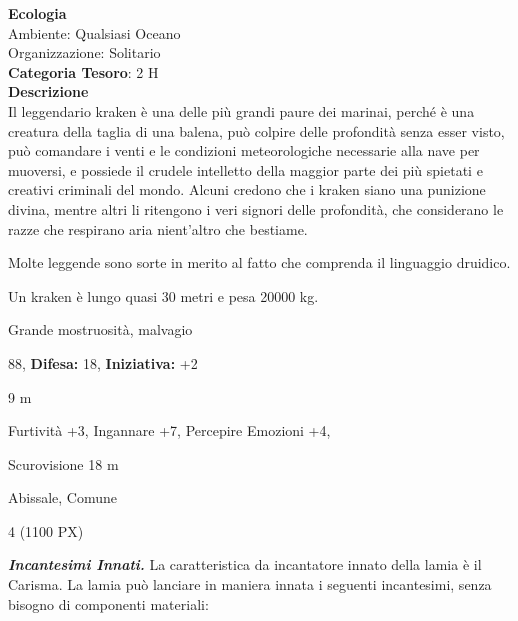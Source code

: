 \begin{multicols}{2}
{\textbf{Ecologia}\\
Ambiente: Qualsiasi Oceano\\
Organizzazione: Solitario\\
\textbf{Categoria Tesoro}: 2 H\\
\textbf{Descrizione}\\
Il leggendario kraken è una delle più grandi paure dei marinai, perché è una creatura della taglia di una balena, può colpire delle profondità senza esser visto, può comandare i venti e le condizioni meteorologiche necessarie alla nave per muoversi, e possiede il crudele intelletto della maggior parte dei più spietati e creativi criminali del mondo. Alcuni credono che i kraken siano una punizione divina, mentre altri li ritengono i veri signori delle profondità, che considerano le razze che respirano aria nient'altro che bestiame.

Molte leggende sono sorte in merito al fatto che comprenda il linguaggio druidico.

Un kraken è lungo quasi 30 metri e pesa 20000 kg.


\noindent
\begin{description}[noitemsep, topsep=0pt, parsep=0pt, partopsep=0pt, leftmargin=0cm, labelwidth=2.2cm]
	\item[\textbf{Taglia/Tipo:}] Grande mostruosità, malvagio
	\item[\textbf{Caratt.:}] 
	\item[\textbf{Punti Ferita:}] 88,  \textbf{Difesa:} 18,  \textbf{Iniziativa:} +2
	\item[\textbf{Movimento:}] 9 m
	\item[\textbf{Tiri Salvez.:}] 
	\item[\textbf{Comp.:}] Furtività +3, Ingannare +7, Percepire Emozioni +4,
	\item[\textbf{Sensi:}] Scurovisione 18 m
	\item[\textbf{Linguaggi:}] Abissale, Comune
	\item[\textbf{Sfida:}] 4 (1100 PX)\smallskip
\end{description}

\emph{\textbf{Incantesimi Innati.}} La caratteristica da incantatore innato della lamia è il Carisma. La lamia può lanciare in maniera innata i seguenti incantesimi, senza bisogno di componenti materiali:

}
\end{multicols}
